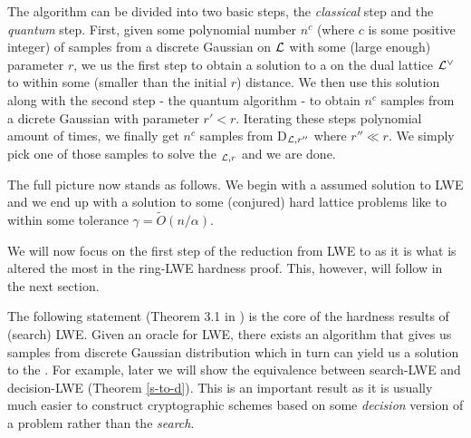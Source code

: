 The algorithm can be divided into two basic steps, the \textit{classical} step and the \textit{quantum} step. First, given some polynomial number $n^c$ (where $c$ is some positive integer) of samples from a discrete Gaussian on $\mathcal{L}$ with some (large enough) parameter $r$, we us the first step to obtain a solution to a  on the dual lattice $\mathcal{L}^{\vee}$ to within some (smaller than the initial $r$) distance. We then use this solution along with the second step - the quantum algorithm - to obtain $n^c$ samples from a dicrete Gaussian with parameter $r' < r$. Iterating these steps polynomial amount of times, we finally get $n^c$ samples from D$_{\mathcal{L}, r''}$ where $r'' \ll r$. We simply pick one of those samples to solve the $_{\mathcal{L}, r}$ and we are done.

The full picture now stands as follows. We begin with a assumed solution to LWE and we end up with a solution to some (conjured) hard lattice problems like  to within some tolerance $\gamma = \tilde{O}(n/\alpha)$.

\begin{center}
\end{center}
We will now focus on the first step of the reduction from LWE to  as it is what is altered the most in the ring-LWE hardness proof. This, however, will follow in the next section.

The following statement (Theorem 3.1 in \cite{regev}) is the core of the hardness results of (search) LWE. Given an oracle for LWE, there exists an algorithm that gives us samples from discrete Gaussian distribution which in turn can yield us a solution to the . For example, later we will show the equivalence between search-LWE and decision-LWE (Theorem \ref{s-to-d}). This is an important result as it is usually much easier to construct cryptographic schemes based on some \textit{decision} version of a problem rather than the \textit{search}.

